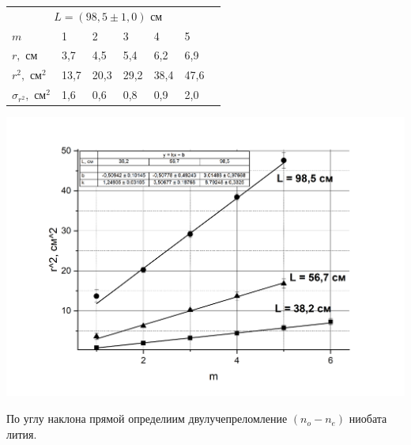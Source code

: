 \documentclass[a4paper,12pt]{article} %
\begin{document}
\begin{table}[h!]
\begin{tabular}{|lllllll}
\multicolumn{6}{|c|}{$L = (98,5 \pm 1,0)   \text{ см}$}                                                                                                                                      &                          \\ \cline{1-6}
\multicolumn{1}{|l|}{$m$}                        & \multicolumn{1}{l|}{1}    & \multicolumn{1}{l|}{2}    & \multicolumn{1}{l|}{3}    & \multicolumn{1}{l|}{4}    & \multicolumn{1}{l|}{5}    &                          \\ \cline{1-6}
\multicolumn{1}{|l|}{$r, \text{ см}$}            & \multicolumn{1}{l|}{3,7}  & \multicolumn{1}{l|}{4,5}  & \multicolumn{1}{l|}{5,4}  & \multicolumn{1}{l|}{6,2}  & \multicolumn{1}{l|}{6,9}  &                          \\ \cline{1-6}
\multicolumn{1}{|l|}{$r^2, \text{ см}^2$}        & \multicolumn{1}{l|}{13,7} & \multicolumn{1}{l|}{20,3} & \multicolumn{1}{l|}{29,2} & \multicolumn{1}{l|}{38,4} & \multicolumn{1}{l|}{47,6} &                          \\ \cline{1-6}
\multicolumn{1}{|l|}{$\sigma_{r^2}, \text{ см}^2$} & \multicolumn{1}{l|}{1,6}  & \multicolumn{1}{l|}{0,6}  & \multicolumn{1}{l|}{0,8}  & \multicolumn{1}{l|}{0,9}  & \multicolumn{1}{l|}{2,0}  &                          \\ \cline{1-6}
\end{tabular}
\end{table} 


\includegraphics[width=1\linewidth]{график.png}


\medskip

\noindent По углу наклона прямой определиим двулучепреломление $(n_o - n_e)$ ниобата лития.
\end{document}
